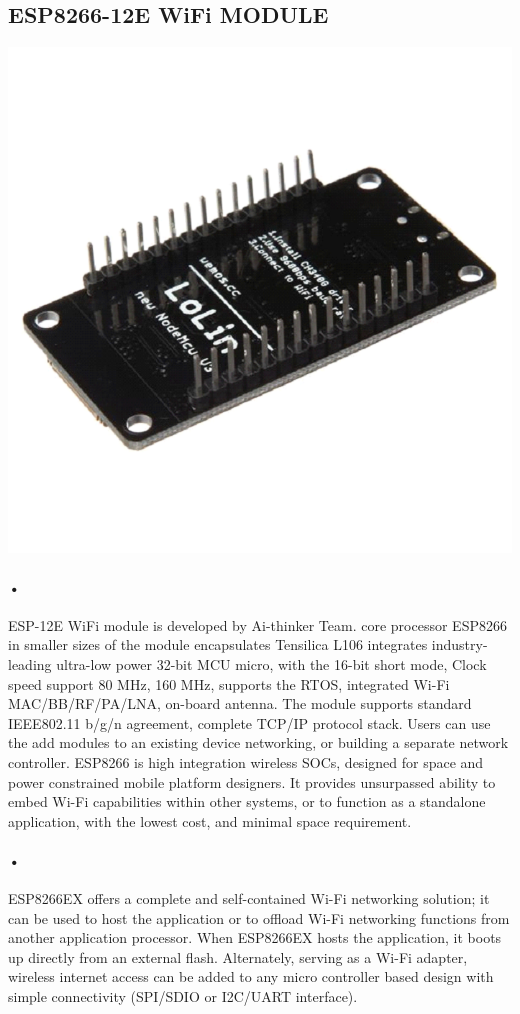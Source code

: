 \documentclass[12pt]{extarticle}
\numberwithin{figure}{section}
\begin{document}
\subsection{ESP8266-12E WiFi MODULE}
\begin{center}
\includegraphics[scale=0.48]{wifi.png}
\end{center}
\paragraph{•}ESP-12E WiFi module is developed by Ai-thinker Team. core processor ESP8266 in smaller sizes of the module encapsulates Tensilica L106 integrates industry-leading ultra-low power 32-bit MCU micro, with the 16-bit short mode, Clock speed support 80 MHz, 160 MHz, supports the RTOS, integrated Wi-Fi MAC/BB/RF/PA/LNA, on-board antenna. The module supports standard IEEE802.11 b/g/n agreement, complete TCP/IP protocol stack. Users can use the add modules to an existing device networking, or building a separate network controller. ESP8266 is high integration wireless SOCs, designed for space and power constrained mobile platform designers. It provides unsurpassed ability to embed Wi-Fi capabilities within other systems, or to function as a standalone application, with the lowest cost, and minimal space requirement.
\paragraph{•}
ESP8266EX offers a complete and self-contained Wi-Fi networking solution; it can be used to host the application or to offload Wi-Fi networking functions from another application processor. When ESP8266EX hosts the application, it boots up directly from an external flash. Alternately, serving as a Wi-Fi adapter, wireless internet access can be added to any micro controller based design with simple connectivity (SPI/SDIO or I2C/UART interface).
\end{document}
